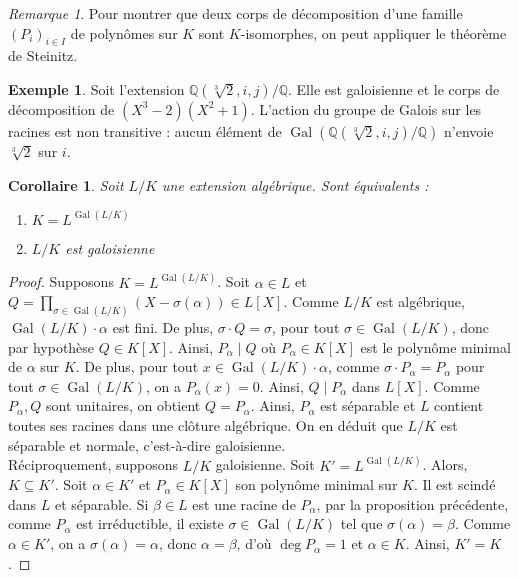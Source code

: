 \documentclass{article}
\newcommand{\Q}{\mathbb{Q}}
\DeclareMathOperator{\Gal}{Gal}
\theoremstyle{plain}
\newtheorem{corollary}[theorem]{Corollaire}
\theoremstyle{definition}
\newtheorem{example}[theorem]{Exemple}
\theoremstyle{remark}
\newtheorem*{remark}{Remarque}
\begin{document}
\begin{remark}
    Pour montrer que deux corps de décomposition d'une famille $(P_i)_{i\in I}$ de polynômes sur $K$ sont $K$-isomorphes, on peut appliquer le théorème de Steinitz.
\end{remark}

\begin{example}
    Soit l'extension $\Q(\sqrt[3]{2},i,j)/\Q$. Elle est galoisienne et le corps de décomposition de $(X^3 - 2)(X^2 + 1)$. L'action du groupe de Galois sur les racines est non transitive : aucun élément de $\Gal(\Q(\sqrt[3]{2},i,j)/\Q)$ n'envoie $\sqrt[3]{2}$ sur $i$.
\end{example}

\begin{corollary}
    Soit $L/K$ une extension algébrique. Sont équivalents :
    \begin{enumerate}
        \item $K = L^{\Gal(L/K)}$
        \item $L/K$ est galoisienne
    \end{enumerate}
\end{corollary}

\begin{proof}
    Supposons $K=L^{\Gal(L/K)}$. Soit $\alpha \in L$ et $Q = \prod\limits_{\sigma \in \Gal(L/K)} (X - \sigma(\alpha)) \in L[X]$. Comme $L/K$ est algébrique, $\Gal(L/K) \cdot \alpha$ est fini. De plus, $\sigma \cdot Q = \sigma$, pour tout $\sigma \in \Gal(L/K)$, donc par hypothèse $Q \in K[X]$. Ainsi, $P_\alpha \mid Q$ où $P_\alpha \in K[X]$ est le polynôme minimal de $\alpha$ sur $K$. De plus, pour tout $x \in \Gal(L/K) \cdot \alpha$, comme $\sigma \cdot P_\alpha = P_\alpha$ pour tout $\sigma \in \Gal(L/K)$, on a $P_\alpha (x) = 0$. Ainsi, $Q \mid P_\alpha$ dans $L[X]$. Comme $P_\alpha,Q$ sont unitaires, on obtient $Q = P_\alpha$. Ainsi, $P_\alpha$ est séparable et $L$ contient toutes ses racines dans une clôture algébrique. On en déduit que $L/K$ est séparable et normale, c'est-à-dire galoisienne. \\
    Réciproquement, supposons $L/K$ galoisienne. Soit $K' = L^{\Gal(L/K)}$. Alors, $K \subseteq K'$. Soit $\alpha \in K'$ et $P_\alpha \in K[X]$ son polynôme minimal sur $K$. Il est scindé dans $L$ et séparable. Si $\beta \in L$ est une racine de $P_\alpha$, par la proposition précédente, comme $P_\alpha$ est irréductible, il existe $\sigma \in \Gal(L/K)$ tel que $\sigma(\alpha) = \beta$. Comme $\alpha \in K'$, on a $\sigma(\alpha) = \alpha$, donc $\alpha = \beta$, d'où $\deg P_\alpha = 1$ et $\alpha \in K$. Ainsi, $K' = K$.
\end{proof}
\end{document}
